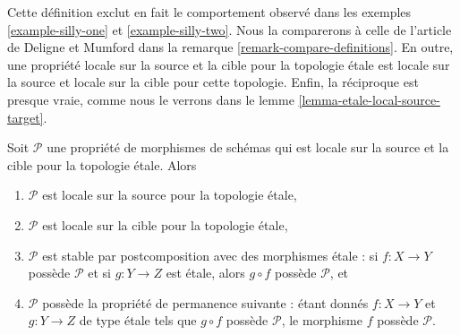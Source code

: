 \noindent
Cette définition exclut en fait le comportement observé dans les
exemples \ref{example-silly-one} et \ref{example-silly-two}.
Nous la comparerons à celle de l'article \cite{DM} de Deligne et Mumford dans
la remarque \ref{remark-compare-definitions}.
En outre, une propriété locale sur la source et la cible pour la topologie
\'etale est locale sur la source et locale sur la cible pour cette topologie.
Enfin, la réciproque est presque vraie, comme nous le verrons dans le
lemme \ref{lemma-etale-local-source-target}.

\begin{lemma}
\label{lemma-local-source-target-implies}
Soit $\mathcal{P}$ une propriété de morphismes de schémas qui est locale sur
la source et la cible pour la topologie \'etale. Alors
\begin{enumerate}
\item $\mathcal{P}$ est locale sur la source pour la topologie \'etale,
\item $\mathcal{P}$ est locale sur la cible pour la topologie \'etale,
\item $\mathcal{P}$ est stable par postcomposition avec des morphismes
\'etale : si $f : X \to Y$ possède $\mathcal{P}$ et si $g : Y \to Z$ est
\'etale, alors $g \circ f$ possède $\mathcal{P}$, et
\item $\mathcal{P}$ possède la propriété de permanence suivante : étant donnés
$f : X \to Y$ et $g : Y \to Z$ de type \'etale tels que $g \circ f$ possède
$\mathcal{P}$, le morphisme $f$ possède $\mathcal{P}$.
\end{enumerate}
\end{lemma}

